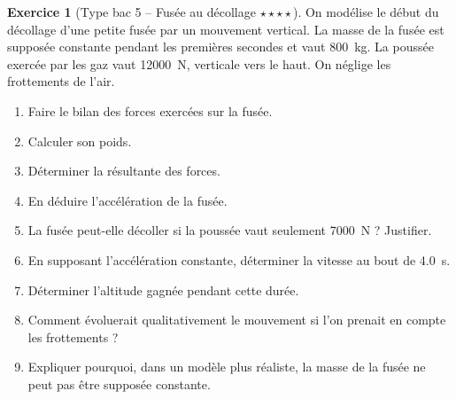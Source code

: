 \documentclass[11pt,a4paper]{article}
\theoremstyle{definition}
\newtheorem{exercice}{Exercice}[section]
\newcommand{\etoiles}[1]{\hfill{\small\textbf{#1}}}
\begin{document}
\begin{exercice}[Type bac 5 -- Fusée au décollage \etoiles{$\star\star\star\star$}]
On modélise le début du décollage d’une petite fusée par un mouvement vertical.
La masse de la fusée est supposée constante pendant les premières secondes et vaut \SI{800}{kg}.
La poussée exercée par les gaz vaut \SI{12000}{N}, verticale vers le haut.
On néglige les frottements de l’air.

\begin{enumerate}[label=\arabic*.]
    \item Faire le bilan des forces exercées sur la fusée.
    \item Calculer son poids.
    \item Déterminer la résultante des forces.
    \item En déduire l’accélération de la fusée.
    \item La fusée peut-elle décoller si la poussée vaut seulement \SI{7000}{N} ? Justifier.
    \item En supposant l’accélération constante, déterminer la vitesse au bout de \SI{4,0}{s}.
    \item Déterminer l’altitude gagnée pendant cette durée.
    \item Comment évoluerait qualitativement le mouvement si l’on prenait en compte les frottements ?
    \item Expliquer pourquoi, dans un modèle plus réaliste, la masse de la fusée ne peut pas être supposée constante.
\end{enumerate}
\end{exercice}
\end{document}
